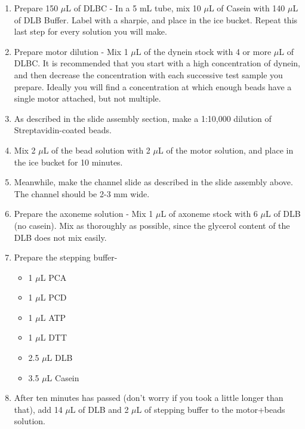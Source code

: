 \documentclass{../lab}
\begin{document}
\begin{enumerate}
    \item Prepare 150 $\mu$L of DLBC - In a 5 mL tube, mix 10 $\mu$L of Casein with 140 $\mu$L of DLB Buffer. Label with a sharpie, and place in the ice bucket. Repeat this last step for every solution you will make.

    \item Prepare motor dilution - Mix 1 $\mu$L of the dynein stock with 4 or more $\mu$L of DLBC. It is recommended that you start with a high concentration of dynein, and then decrease the concentration with each successive test sample you prepare. Ideally you will find a concentration at which enough beads have a single motor attached, but not multiple.

    \item As described in the slide assembly section, make a 1:10,000 dilution of Streptavidin-coated beads.

    \item Mix 2 $\mu$L of the bead solution with 2 $\mu$L of the motor solution, and place in the ice bucket for 10 minutes.

    \item Meanwhile, make the channel slide as described in the slide assembly above. The channel should be 2-3 mm wide.

    \item Prepare the axoneme solution - Mix 1 $\mu$L of axoneme stock with 6 $\mu$L of DLB (no casein). Mix as thoroughly as possible, since the glycerol content of the DLB does not mix easily.

    \item Prepare the stepping buffer-
    \begin{itemize}
        \item 1 $\mu$L PCA
    
        \item 1 $\mu$L PCD
    
        \item 1 $\mu$L ATP
    
        \item 1 $\mu$L DTT
    
        \item 2.5 $\mu$L DLB
    
        \item 3.5 $\mu$L Casein
    \end{itemize}

    \item After ten minutes has passed (don't worry if you took a little longer than that), add 14 $\mu$L of DLB and 2 $\mu$L of stepping buffer to the motor+beads solution.


\end{enumerate}
\end{document}
